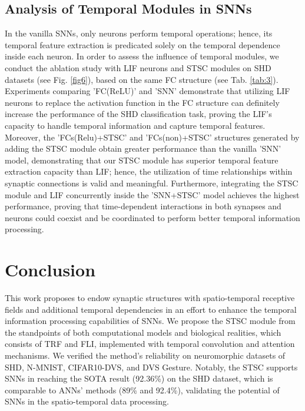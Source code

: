 \documentclass[letterpaper]{article} \usepackage[submission]{aaai23}  \usepackage{times}  \usepackage{helvet}  \usepackage{courier}  \usepackage[hyphens]{url}  \usepackage{graphicx} \urlstyle{rm} \def\UrlFont{\rm}  \usepackage{natbib}  \usepackage{caption} \frenchspacing  \setlength{\pdfpagewidth}{8.5in} \setlength{\pdfpageheight}{11in} \usepackage{algorithm}
\begin{document}
\subsection{Analysis of Temporal Modules in SNNs}
In the vanilla SNNs, only neurons perform temporal operations; hence, its temporal feature extraction is predicated solely on the temporal dependence inside each neuron.
In order to assess the influence of temporal modules, we conduct the ablation study with LIF neurons and STSC modules on SHD datasets (see Fig. \ref{fig6}), based on the same FC structure (see Tab. \ref{tab:3}).
Experiments comparing 'FC(ReLU)' and 'SNN' demonstrate that utilizing LIF neurons to replace the activation function in the FC structure can definitely increase the performance of the SHD classification task, proving the LIF's capacity to handle temporal information and capture temporal features. 
Moreover, the 'FCs(Relu)+STSC' and 'FCs(non)+STSC' structures generated by adding the STSC module obtain greater performance than the vanilla 'SNN' model, demonstrating that our STSC module has superior temporal feature extraction capacity than LIF; hence, the utilization of time relationships within synaptic connections is valid and meaningful. 
Furthermore, integrating the STSC module and LIF concurrently inside the 'SNN+STSC' model achieves the highest performance, proving that time-dependent interactions in both synapses and neurons could coexist and be coordinated to perform better temporal information processing.
\section{Conclusion}
This work proposes to endow synaptic structures with spatio-temporal receptive fields and additional temporal dependencies in an effort to enhance the temporal information processing capabilities of SNNs. 
We propose the STSC module from the standpoints of both computational models and biological realities, which consists of TRF and FLI, implemented with temporal convolution and attention mechanisms. 
We verified the method's reliability on neuromorphic datasets of SHD, N-MNIST, CIFAR10-DVS, and DVS Gesture. 
Notably, the STSC supports SNNs in reaching the SOTA result (92.36\%) on the SHD dataset, which is comparable to ANNs' methods (89\% and 92.4\%), validating the potential of SNNs in the spatio-temporal data processing.


\end{document}
